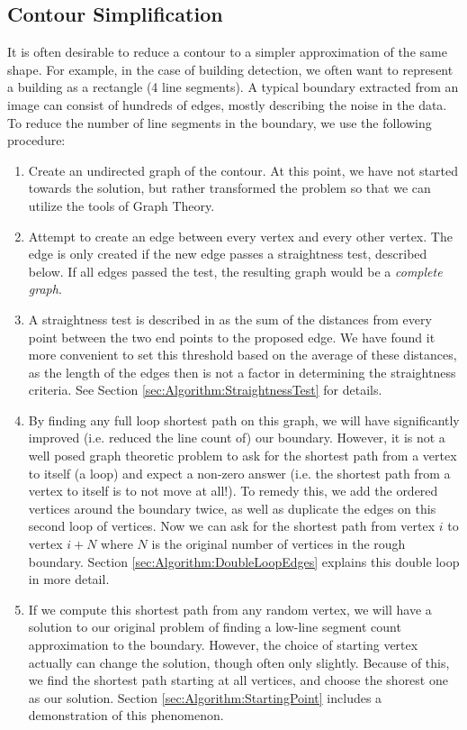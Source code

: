 \documentclass{InsightArticle}
\begin{document}
\subsection{Contour Simplification}
\label{sec:Algorithm:ContourSimplification}
It is often desirable to reduce a contour to a simpler approximation of the same shape. For example, in the case of building detection, we often want to represent a building as a rectangle (4 line segments). A typical boundary extracted from an image can consist of hundreds of edges, mostly describing the noise in the data. To reduce the number of line segments in the boundary, we use the following procedure:
\begin{enumerate}
  \item Create an undirected graph of the contour. At this point, we have not started towards the solution, but rather transformed the problem so that we can utilize the tools of Graph Theory.
 \item Attempt to create an edge between every vertex and every other vertex. The edge is only created if the new edge passes a straightness test, described below. If all edges passed the test, the resulting graph would be a \emph{complete graph}.
 \item A straightness test is described in \cite{WangThesis} as the sum of the distances from every point between the two end points to the proposed edge. We have found it more convenient to set this threshold based on the average of these distances, as the length of the edges then is not a factor in determining the straightness criteria. See Section \ref{sec:Algorithm:StraightnessTest} for details.
 \item By finding any full loop shortest path on this graph, we will have significantly improved (i.e. reduced the line count of) our boundary. However, it is not a well posed graph theoretic problem to ask for the shortest path from a vertex to itself (a loop) and expect a non-zero answer (i.e. the shortest path from a vertex to itself is to not move at all!). To remedy this, we add the ordered vertices around the boundary twice, as well as duplicate the edges on this second loop of vertices. Now we can ask for the shortest path from vertex $i$ to vertex $i+N$ where $N$ is the original number of vertices in the rough boundary. Section \ref{sec:Algorithm:DoubleLoopEdges} explains this double loop in more detail.
 \item If we compute this shortest path from any random vertex, we will have a solution to our original problem of finding a low-line segment count approximation to the boundary. However, the choice of starting vertex actually can change the solution, though often only slightly. Because of this, we find the shortest path starting at all vertices, and choose the shorest one as our solution. Section \ref{sec:Algorithm:StartingPoint} includes a demonstration of this phenomenon.
\end{enumerate}
\end{document}
